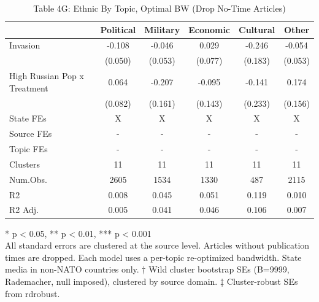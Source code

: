 \begin{table}[!t]
\caption{Table 4G: Ethnic By Topic, Optimal BW (Drop No-Time Articles)} 
\fontsize{12.0pt}{14.4pt}\selectfont
\begin{tabular*}{\linewidth}{@{\extracolsep{\fill}}lccccc}
\toprule
  & Political & Military & Economic & Cultural & Other \\ 
\midrule\addlinespace[2.5pt]
Invasion & -0.108 & -0.046 & 0.029 & -0.246 & -0.054 \\ 
 & (0.050) & (0.053) & (0.077) & (0.183) & (0.053) \\ 
High Russian Pop x Treatment & 0.064 & -0.207 & -0.095 & -0.141 & 0.174 \\ 
{} & {(0.082)} & {(0.161)} & {(0.143)} & {(0.233)} & {(0.156)} \\ 
State FEs & X & X & X & X & X \\ 
Source FEs & - & - & - & - & - \\ 
Topic FEs & - & - & - & - & - \\ 
Clusters & 11 & 11 & 11 & 11 & 11 \\ 
Num.Obs. & 2605 & 1534 & 1330 & 487 & 2115 \\ 
R2 & 0.008 & 0.045 & 0.051 & 0.119 & 0.010 \\ 
R2 Adj. & 0.005 & 0.041 & 0.046 & 0.106 & 0.007 \\ 
\bottomrule
\end{tabular*}
\begin{minipage}{\linewidth}
* p < 0.05, ** p < 0.01, *** p < 0.001\\
All standard errors are clustered at the source level. Articles without
publication times are dropped. Each model uses a per-topic re-optimized
bandwidth. State media in non-NATO countries only. † Wild cluster bootstrap SEs
(B=9999, Rademacher, null imposed), clustered by source domain. ‡ Cluster-robust
SEs from rdrobust.\\
\end{minipage}
\end{table}

